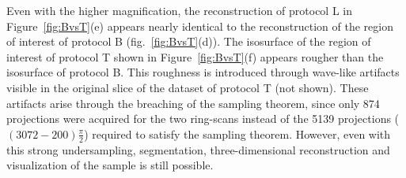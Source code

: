 Even with the higher magnification, the reconstruction of protocol L in Figure~\ref{fig:BvsT}(e) appears nearly identical to the reconstruction of the region of interest of protocol B (fig.~\ref{fig:BvsT}(d)). The isosurface of the region of interest of protocol T shown in Figure~\ref{fig:BvsT}(f) appears rougher than the isosurface of protocol B. This roughness is introduced through wave-like artifacts visible in the original slice of the dataset of protocol T (not shown). These artifacts arise through the breaching of the sampling theorem, since only 874 projections were acquired for the two ring-scans instead of the 5139 projections ($(3072-200)\frac{\pi}{2}$) required to satisfy the sampling theorem. However, even with this strong undersampling, segmentation, three-dimensional reconstruction and visualization of the sample is still possible.

